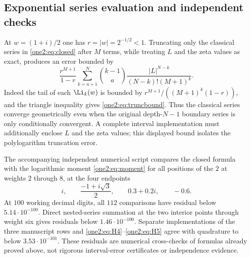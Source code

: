 \subsection{Exponential series evaluation and independent checks}

At $w=(1+i)/2$ one has $r=|w|=2^{-1/2}<1$.  Truncating only the
classical series in \eqref{one2:eq:closed} after $M$ terms, while
treating $L$ and the zeta values as exact, produces an error bounded by
\begin{equation}
 \frac{r^{M+1}}{1-r}
 \sum_{k=a+1}^N\binom{k-1}{a}
       \frac{|L|^{N-k}}{(N-k)!(M+1)^k}.
 \label{one2:eq:truncbound}
\end{equation}
Indeed the tail of each $\Li_k(w)$ is bounded by
$r^{M+1}/((M+1)^k(1-r))$, and the triangle inequality gives
\eqref{one2:eq:truncbound}.  Thus the classical series converge
geometrically even when the original depth-$N-1$ boundary series is
only conditionally convergent.  A complete interval implementation
must additionally enclose $L$ and the zeta values; this displayed
bound isolates the polylogarithm truncation error.

The accompanying independent numerical script compares the closed
formula with the logarithmic moment \eqref{one2:eq:moment} for all
positions of the $2$ at weights $2$ through $8$, at the four endpoints
\[
 i,\qquad\frac{-1+i\sqrt3}{2},\qquad 0.3+0.2i,\qquad-0.6.
\]
At $100$ working decimal digits, all $112$ comparisons have residual
below $5.14\cdot10^{-100}$.  Direct nested-series summation at the two
interior points through weight six gives residuals below
$1.46\cdot10^{-100}$.  Separate implementations of the three
manuscript rows and \eqref{one2:eq:H4}--\eqref{one2:eq:H5} agree with
quadrature to below $3.53\cdot10^{-101}$.  These residuals are
numerical cross-checks of formulas already proved above, not
rigorous interval-error certificates or independence evidence.


